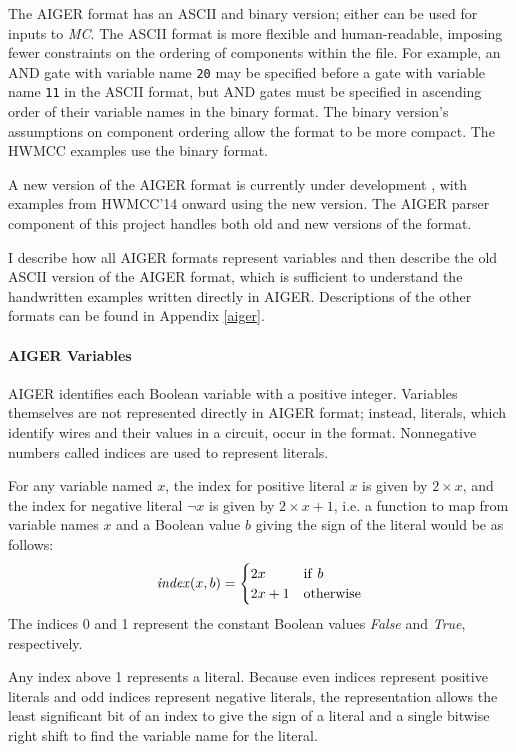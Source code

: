 \documentclass[12pt,a4paper,twoside,openright]{report}
\begin{document}
{The AIGER format has an ASCII and binary version; either
can be used for inputs to \emph{MC}. The ASCII
format is more flexible and human-readable, imposing fewer constraints
on the ordering of components within the file. For example, an
AND gate with variable name {\tt 20} may be specified before a gate with
variable name {\tt 11} in the ASCII format, but AND gates must be specified in
ascending order of their variable names in the binary format.
The binary version's assumptions on component ordering allow the format
to be more compact. The HWMCC examples use the binary format.

A new version of the AIGER format is currently under development \cite{aiger}, with
examples from HWMCC'14 onward using the new version. The AIGER parser component
of this project handles both old and new versions of the format.

I describe how all AIGER formats represent variables
and then describe the old ASCII version of the AIGER format, which
is sufficient to understand the handwritten examples written directly
in AIGER. Descriptions of the other formats can be found in Appendix
\ref{aiger}.

\paragraph{AIGER Variables}{
AIGER identifies each Boolean variable with a positive integer.
Variables themselves are not represented directly in AIGER format; instead, literals,
which identify wires and their values in a circuit,
occur in the format. Nonnegative numbers called indices are used to represent literals.

For any variable named $x$, the index for positive literal $x$ is given by
$2 \times x$, and the index for negative literal $\neg x$ is given by
$2 \times x + 1$, i.e. a function to map from variable names $x$ and a Boolean
value $b$ giving the sign of the literal would be as follows:
$${\it index}(x, b) =
\begin{cases}
2x & {\rm if}~b \\
2x + 1 & {\rm otherwise}
\end{cases}$$
The indices 0 and 1 represent the constant Boolean values {\it False}
and {\it True}, respectively.

Any index above 1 represents a literal. 
Because even indices represent positive literals and odd indices
represent negative literals, the representation allows
the least significant bit of an index to give the sign of a literal
and a single bitwise right shift to find the variable name for the literal.

}}
\end{document}
